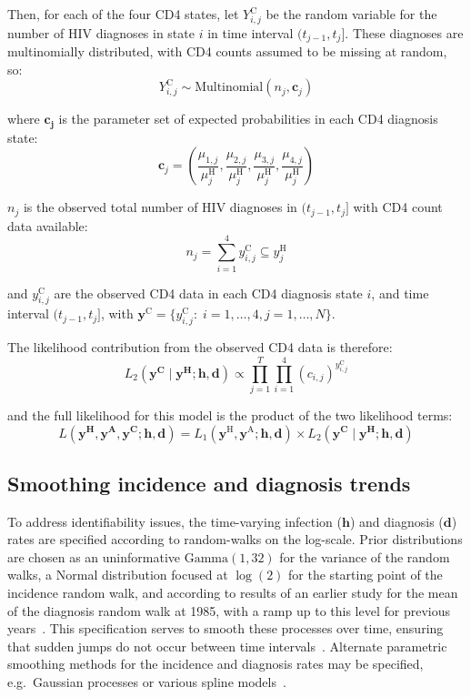Then, for each of the four CD4 states, let $Y^\text{C}_{i,j}$ be the random variable for the number of HIV diagnoses in state $i$ in time interval $(t_{j-1},t_j]$. These diagnoses are multinomially distributed, with CD4 counts assumed to be missing at random, so:
%
\[
  Y^\text{C}_{i,j} \sim \text{Multinomial}(n_j,\bm{c}_j)
\]

where $\bm{c_j}$ is the parameter set of expected probabilities in each CD4 diagnosis state:
%
\[
  \bm{c}_j = \left(\frac{\mu_{1,j}}{\mu_j^\text{H}},\frac{\mu_{2,j}}{\mu_j^\text{H}},\frac{\mu_{3,j}}{\mu_j^\text{H}},\frac{\mu_{4,j}}{\mu_j^\text{H}}\right)
\]

$n_j$ is the observed total number of HIV diagnoses in $(t_{j-1},t_j]$ with CD4 count data available:
%
\[
  n_j = \sum_{i=1}^4{y^\text{C}_{i,j}} \subseteq y^\text{H}_j
\]

and $y_{i,j}^\text{C}$ are the observed CD4 data in each CD4 diagnosis state $i$, and time interval $(t_{j-1},t_j]$, with $\bm{y}^\text{C} = \{y_{i,j}^\text{C}:\; i = 1,\ldots,4, j = 1,\ldots,N\}$.

The likelihood contribution from the observed CD4 data is therefore:
%
\[
  L_2(\bm{y^{\text{C}}} \mid \bm{y^\text{H}};\bm{h},\bm{d})\propto \prod_{j=1}^T \prod_{i=1}^4 {(c_{i,j})}^{y^{\text{C}}_{i,j}}
\]

and the full likelihood for this model is the product of the two likelihood terms:
%
\[
  L(\bm{y^\text{H}}, \bm{y^\text{A}},\bm{y^{\text{C}}};\bm{h},\bm{d}) = L_1(\bm{y}^\text{H}, \bm{y}^\text{A};\bm{h},\bm{d}) \times L_2(\bm{y^{\text{C}}} \mid \bm{y^\text{H}};\bm{h},\bm{d})
\]

\subsection{Smoothing incidence and diagnosis trends}

To address identifiability issues, the time-varying infection ($\bm{h}$) and diagnosis ($\bm{d}$) rates are specified according to random-walks on the log-scale. Prior distributions are chosen as an uninformative $\text{Gamma}(1,32)$ for the variance of the random walks, a Normal distribution focused at $\log(2)$ for the starting point of the incidence random walk, and according to results of an earlier study for the mean of the diagnosis random walk at 1985, with a ramp up to this level for previous years~\parencite{Aalen1997-jh, Birrell2013-va}. This specification serves to smooth these processes over time, ensuring that sudden jumps do not occur between time intervals~\parencite{Birrell2012-hw}. Alternate parametric smoothing methods for the incidence and diagnosis rates may be specified, e.g.\ Gaussian processes or various spline models~\parencite{Brizzi2017-fv}.

